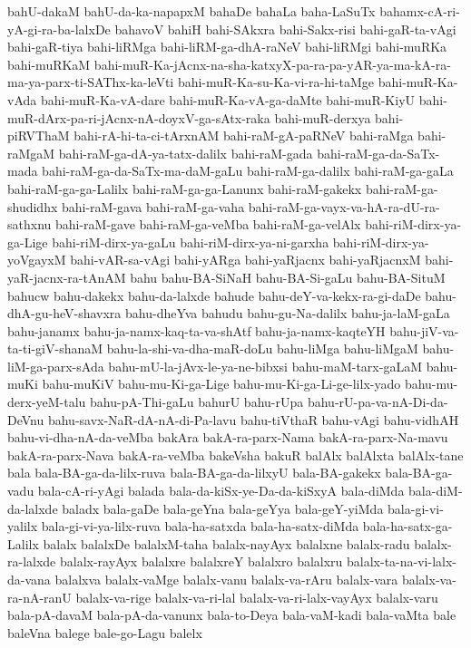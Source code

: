 {bahU-dakaM
bahU-da-ka-napapxM
bahaDe
bahaLa
baha-LaSuTx
bahamx-cA-ri-yA-gi-ra-ba-lalxDe
bahavoV
bahiH
bahi-SAkxra
bahi-Sakx-risi
bahi-gaR-ta-vAgi
bahi-gaR-tiya
bahi-liRMga
bahi-liRM-ga-dhA-raNeV
bahi-liRMgi
bahi-muRKa
bahi-muRKaM
bahi-muR-Ka-jAcnx-na-sha-katxyX-pa-ra-pa-yAR-ya-ma-kA-ra-ma-ya-parx-ti-SAThx-ka-leVti
bahi-muR-Ka-su-Ka-vi-ra-hi-taMge
bahi-muR-Ka-vAda
bahi-muR-Ka-vA-dare
bahi-muR-Ka-vA-ga-daMte
bahi-muR-KiyU
bahi-muR-dArx-pa-ri-jAcnx-nA-doyxV-ga-sAtx-raka
bahi-muR-derxya
bahi-piRVThaM
bahi-rA-hi-ta-ci-tArxnAM
bahi-raM-gA-paRNeV
bahi-raMga
bahi-raMgaM
bahi-raM-ga-dA-ya-tatx-dalilx
bahi-raM-gada
bahi-raM-ga-da-SaTx-mada
bahi-raM-ga-da-SaTx-ma-daM-gaLu
bahi-raM-ga-dalilx
bahi-raM-ga-gaLa
bahi-raM-ga-ga-Lalilx
bahi-raM-ga-ga-Lanunx
bahi-raM-gakekx
bahi-raM-ga-shudidhx
bahi-raM-gava
bahi-raM-ga-vaha
bahi-raM-ga-vayx-va-hA-ra-dU-ra-sathxnu
bahi-raM-gave
bahi-raM-ga-veMba
bahi-raM-ga-velAlx
bahi-riM-dirx-ya-ga-Lige
bahi-riM-dirx-ya-gaLu
bahi-riM-dirx-ya-ni-garxha
bahi-riM-dirx-ya-yoVgayxM
bahi-vAR-sa-vAgi
bahi-yARga
bahi-yaRjacnx
bahi-yaRjacnxM
bahi-yaR-jacnx-ra-tAnAM
bahu
bahu-BA-SiNaH
bahu-BA-Si-gaLu
bahu-BA-SituM
bahucw
bahu-dakekx
bahu-da-lalxde
bahude
bahu-deY-va-kekx-ra-gi-daDe
bahu-dhA-gu-heV-shavxra
bahu-dheYva
bahudu
bahu-gu-Na-dalilx
bahu-ja-laM-gaLa
bahu-janamx
bahu-ja-namx-kaq-ta-va-shAtf
bahu-ja-namx-kaqteYH
bahu-jiV-va-ta-ti-giV-shanaM
bahu-la-shi-va-dha-maR-doLu
bahu-liMga
bahu-liMgaM
bahu-liM-ga-parx-sAda
bahu-mU-la-jAvx-le-ya-ne-bibxsi
bahu-maM-tarx-gaLaM
bahu-muKi
bahu-muKiV
bahu-mu-Ki-ga-Lige
bahu-mu-Ki-ga-Li-ge-lilx-yado
bahu-mu-derx-yeM-talu
bahu-pA-Thi-gaLu
bahurU
bahu-rUpa
bahu-rU-pa-va-nA-Di-da-DeVnu
bahu-savx-NaR-dA-nA-di-Pa-lavu
bahu-tiVthaR
bahu-vAgi
bahu-vidhAH
bahu-vi-dha-nA-da-veMba
bakAra
bakA-ra-parx-Nama
bakA-ra-parx-Na-mavu
bakA-ra-parx-Nava
bakA-ra-veMba
bakeVsha
bakuR
balAlx
balAlxta
balAlx-tane
bala
bala-BA-ga-da-lilx-ruva
bala-BA-ga-da-lilxyU
bala-BA-gakekx
bala-BA-ga-vadu
bala-cA-ri-yAgi
balada
bala-da-kiSx-ye-Da-da-kiSxyA
bala-diMda
bala-diM-da-lalxde
baladx
bala-gaDe
bala-geYna
bala-geYya
bala-geY-yiMda
bala-gi-vi-yalilx
bala-gi-vi-ya-lilx-ruva
bala-ha-satxda
bala-ha-satx-diMda
bala-ha-satx-ga-Lalilx
balalx
balalxDe
balalxM-taha
balalx-nayAyx
balalxne
balalx-radu
balalx-ra-lalxde
balalx-rayAyx
balalxre
balalxreY
balalxro
balalxru
balalx-ta-na-vi-lalx-da-vana
balalxva
balalx-vaMge
balalx-vanu
balalx-va-rAru
balalx-vara
balalx-va-ra-nA-ranU
balalx-va-rige
balalx-va-ri-lal
balalx-va-ri-lalx-vayAyx
balalx-varu
bala-pA-davaM
bala-pA-da-vanunx
bala-to-Deya
bala-vaM-kadi
bala-vaMta
bale
baleVna
balege
bale-go-Lagu
balelx
}
